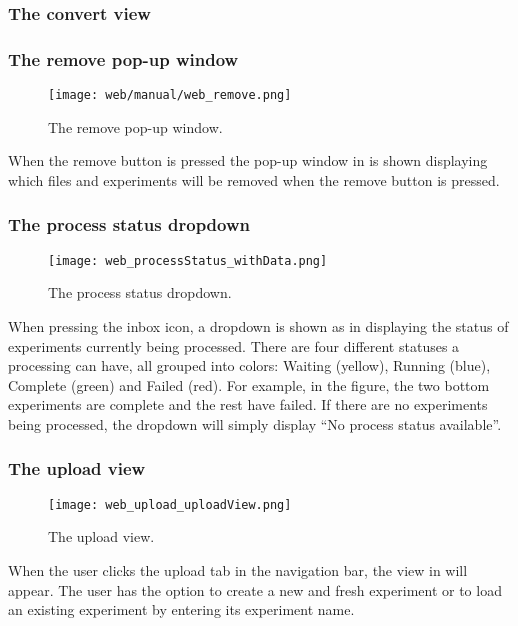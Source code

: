 \subsubsection{The convert view} \label{sssec:convertView}

\subsubsection{The remove pop-up window}
\begin{figure}[h]
\centering
\texttt{[image: web/manual/web\_remove.png]}
\caption{\label{fig:web_remove_removeFiles}The remove pop-up window.}
\end{figure}
\FloatBarrier
When the remove button is pressed the pop-up window in  is shown displaying which files and experiments will be removed when the remove button is pressed.


\subsubsection{The process status dropdown}
\begin{figure}[h]
\centering
\texttt{[image: web\_processStatus\_withData.png]}
\caption{\label{fig:web_processStatus_withData}The process status dropdown.}
\end{figure}
\FloatBarrier
When pressing the inbox icon, a dropdown is shown as in  displaying the status of experiments currently being processed. There are four different statuses a processing can have, all grouped into colors: Waiting (yellow), Running (blue), Complete (green) and Failed (red). For example, in the figure, the two bottom experiments are complete and the rest have failed. If there are no experiments being processed, the dropdown will simply display “No process status available”.


\subsubsection{The upload view}

\begin{figure}[h]
\centering
\texttt{[image: web\_upload\_uploadView.png]}
\caption{\label{fig:web_upload_uploadView}The upload view.}
\end{figure}

When the user clicks the upload tab in the navigation bar, the view in  will appear. The user has the option to create a new and fresh experiment or to load an existing experiment by entering its experiment name. 

